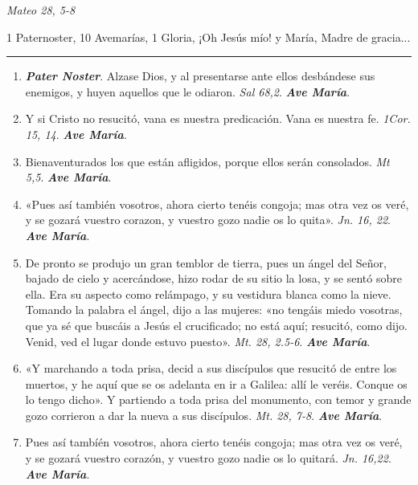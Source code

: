 \documentclass[11pt,a4paper]{book}
\begin{document}
    \begin{flushright}
        \emph{Mateo 28, 5-8}
    \end{flushright}    

    1 Paternoster, 10 Avemarías, 1 Gloria, ¡Oh Jesús mío! y María, Madre de gracia...

    \rule{\textwidth}{0.5pt}

    \begin{enumerate}
    
        \item \textbf{\emph{Pater Noster}}. Alzase Dios, y al presentarse ante ellos desbándese sus enemigos, y huyen aquellos que le odiaron. \emph{Sal 68,2}. \textbf{\emph{Ave María}}.
        
        \item Y si Cristo no resucitó, vana es nuestra predicación. Vana es nuestra fe. \emph{1Cor. 15, 14}. \textbf{\emph{Ave María}}.

        \item Bienaventurados los que están afligidos, porque ellos serán consolados. \emph{Mt 5,5}. \textbf{\emph{Ave María}}.

        \item «Pues así también vosotros, ahora cierto tenéis congoja; mas otra vez os veré, y se gozará vuestro corazon, y vuestro gozo nadie os lo quita». \emph{Jn. 16, 22}. \textbf{\emph{Ave María}}.

        \item De pronto se produjo un gran temblor de tierra, pues un ángel del Señor, bajado de cielo y acercándose, hizo rodar de su sitio la losa, y se sentó sobre ella. 
            Era su aspecto como relámpago, y su vestidura blanca como la nieve. Tomando la palabra el ángel, dijo a las mujeres: «no tengáis miedo vosotras, que ya sé que buscáis 
            a Jesús el crucificado; no está aquí; resucitó, como dijo. Venid, ved el lugar donde estuvo puesto». \emph{Mt. 28, 2.5-6}. \textbf{\emph{Ave María}}.

        \item «Y marchando a toda prisa, decid a sus discípulos que resucitó de entre los muertos, y he aquí que se os adelanta en ir a Galilea: allí le veréis. Conque os lo tengo dicho». 
            Y partiendo a toda prisa del monumento, con temor y grande gozo corrieron a dar la nueva a sus discípulos. \emph{Mt. 28, 7-8}. \textbf{\emph{Ave María}}.

        \item Pues así tambíén vosotros, ahora cierto tenéis congoja; mas otra vez os veré, y se gozará vuestro corazón, y vuestro gozo nadie os lo quitará. \emph{Jn. 16,22}. \textbf{\emph{Ave María}}.


\end{enumerate}
\end{document}
